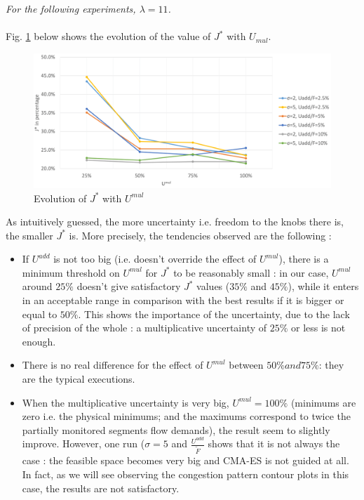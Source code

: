 \emph{For the following experiments, $\lambda=11$.}\\
\\
Fig. \ref{fig:umulevolution} below shows the evolution of the value of $J^{*}$ with $U_{mul}$.
\begin{figure}[h]
	\label{fig:umulevolution}
	\caption{Evolution of $J^{*}$ with $U^{mul}$}
	\includegraphics[width=7in]{figures/umul.png}
\end{figure}
As intuitively guessed, the more uncertainty i.e. freedom to the knobs there is, the smaller $J^{*}$ is.
More precisely, the tendencies observed are the following :
\begin{itemize}
	\item If $U^{add}$ is not too big (i.e. doesn't override the effect of $U^{mul}$), there is a minimum threshold on $U^{mul}$ for $J^{*}$ to be reasonably small : in our case, $U^{mul}$ around $25\% $ doesn't give satisfactory $J^{*}$ values ($35\% $ and $45\% $), while it enters in an acceptable range in comparison with the best results if it is bigger or equal to $50\% $. This shows the importance of the uncertainty, due to the lack of precision of the whole : a multiplicative uncertainty of $25\% $ or less is not enough.
	\item There is no real difference for the effect of $U^{mul}$ between $50\% and 75\% $: they are the typical executions.
	\item When the multiplicative uncertainty is very big, $U^{mul}=100\% $ (minimums are zero i.e. the physical minimums; and the maximums correspond to twice the partially monitored segments flow demands), the result seem to slightly improve. However, one run ($\sigma=5$ and $\frac{U^{add}}{\widetilde{F}}$ shows that it is not always the case :  the feasible space becomes very big and CMA-ES is not guided at all. In fact, as we will see observing the congestion pattern contour plots in this case, the results are not satisfactory.
\end{itemize} 
